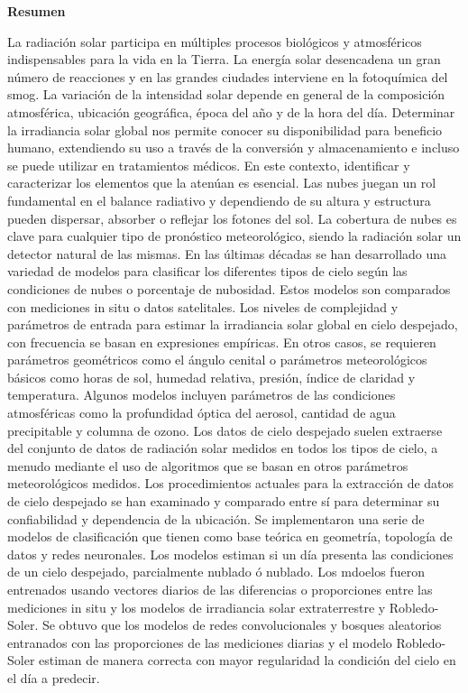 \begin{center}
	\textbf{\centering \large Resumen} \vspace{0.5cm}\\
	\begin{minipage}{0.85\linewidth}
		La radiación solar participa en múltiples procesos biológicos y atmosféricos indispensables para la vida en la Tierra. La energía solar desencadena un gran número de reacciones y en las grandes ciudades interviene en la fotoquímica del smog. La variación de la intensidad solar depende en general de la composición atmosférica, ubicación geográfica, época del año y de la hora del día. Determinar la irradiancia solar global nos permite conocer su disponibilidad para beneficio humano, extendiendo su uso a través de la conversión y almacenamiento e incluso se puede utilizar en tratamientos médicos. En este contexto, identificar y caracterizar los elementos que la atenúan es esencial. Las nubes juegan un rol fundamental en el balance radiativo y dependiendo de su altura y estructura pueden dispersar, absorber o reflejar los fotones del sol. La cobertura de nubes es clave para cualquier tipo de pronóstico meteorológico, siendo la radiación solar un detector natural de las mismas. En las últimas décadas se han desarrollado una variedad de modelos para clasificar los diferentes tipos de cielo según las condiciones de nubes o porcentaje de nubosidad. Estos modelos son comparados con mediciones in situ o datos satelitales. Los niveles de complejidad y parámetros de entrada para estimar la irradiancia solar global en cielo despejado, con frecuencia se basan en expresiones empíricas. En otros casos, se requieren parámetros geométricos como el ángulo cenital o parámetros meteorológicos básicos como horas de sol, humedad relativa, presión, índice de claridad y temperatura. Algunos modelos incluyen parámetros de las condiciones atmosféricas como la profundidad óptica del aerosol, cantidad de agua precipitable y columna de ozono. Los datos de cielo despejado suelen extraerse del conjunto de datos de radiación solar medidos en todos los tipos de cielo, a menudo mediante el uso de algoritmos que se basan en otros parámetros meteorológicos medidos. Los procedimientos actuales para la extracción de datos de cielo despejado se han examinado y comparado entre sí para determinar su confiabilidad y dependencia de la ubicación. Se implementaron una serie de modelos de clasificación que tienen como base teórica en geometría, topología de datos y redes neuronales. Los modelos estiman si un día presenta las condiciones de un cielo despejado, parcialmente nublado ó nublado. Los mdoelos fueron entrenados usando vectores diarios de las diferencias o proporciones entre las mediciones in situ y los modelos de irradiancia solar extraterrestre y Robledo-Soler. Se obtuvo que los modelos de redes convolucionales y bosques aleatorios entranados con las proporciones de las mediciones diarias y el modelo Robledo-Soler estiman de manera correcta con mayor regularidad la condición del cielo en el día a predecir.
	\end{minipage}
\end{center}
